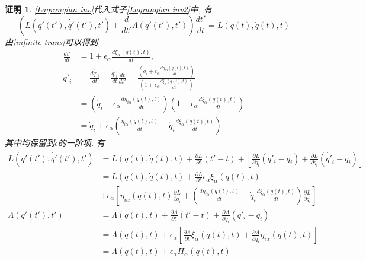 \documentclass[a4paper,11pt]{article}
\theoremstyle{mystyle}
\newtheorem{Proof}{\hspace{2em}证明}[section]
\begin{document}
\begin{Proof}
  \eqref{Lagrangian inv}代入式子\eqref{Lagrangian inv2}中, 有
  \begin{equation}\label{coninv Lagrangian}
      \left(L(q'(t'),\dot{q'}(t'),t')+\frac{d}{dt'}\Lambda(q'(t'),t')\right)\frac{dt'}{dt}=L(q(t),\dot{q}(t),t)
  \end{equation}
  由\eqref{infinite trans}可以得到
  \begin{equation*}
    \begin{split}
       \frac{dt'}{dt}&=1+\epsilon_\alpha\frac{d\xi_\alpha(q(t),t)}{dt},\\
        \dot{q'}_i&=\frac{d\dot{q'}_i}{dt}=\frac{\dot{q'}_i}{dt}\frac{dt}{dt'}=\frac{\left(\dot{q}_i+\epsilon_\alpha\frac{d\eta_{i\alpha}(q(t),t)}{dt}\right)}{\left(1+\epsilon_\alpha\frac{d\xi_{\alpha}(q(t),t)}{dt}\right)}\\
         &=\left(\dot{q}_i+\epsilon_\alpha\frac{d\eta_{i\alpha}(q(t),t)}{dt}\right)\left(1-\epsilon_\alpha\frac{d\xi_{\alpha}(q(t),t)}{dt}\right)\\
         &=\dot{q}_i+\epsilon_\alpha\left(\frac{\eta_{i\alpha}(q(t),t)}{dt}-\dot{q}_i\frac{d\xi_{\alpha}(q(t),t)}{dt}\right)
    \end{split}
  \end{equation*}
  其中均保留到$\epsilon$的一阶项. 有
  \begin{equation*}
    \begin{split}
       L(q'(t'),\dot{q'}(t'),t')&=L(q(t),\dot{q}(t),t)+\frac{\partial L}{\partial t}(t'-t)+\left[\frac{\partial{L}}{\partial{\dot{q}_i}}(q'_i-q_i)+\frac{\partial L}{\partial{\dot{q}_i}}(\dot{q'}_i-\dot{q}_i)\right]\\
         & =L(q(t),\dot{q}(t),t)+\frac{\partial L}{\partial t}\epsilon_\alpha\xi_\alpha(q(t),t)\\
         & +\epsilon_\alpha\left[\eta_{i\alpha}(q(t),t)\frac{\partial L}{\partial {q_i}}+\left(\frac{d\eta_{i\alpha}(q(t),t)}{dt}-\dot{q}_i\frac{d\xi_\alpha(q(t),t)}{dt}\right)\frac{\partial L}{\partial \dot{q}_i}\right]\\
         \Lambda(q'(t'),t')&=\Lambda(q(t),t)+\frac{\partial \Lambda}{\partial t}(t'-t)+\frac{\partial \Lambda}{\partial{q_i}}(q'_i-q_i)\\
         &=\Lambda(q(t),t)+\epsilon_\alpha\left[\frac{\partial \Lambda}{\partial t}\xi_\alpha(q(t),t)+\frac{\partial \Lambda}{\partial q_i}\eta_{i\alpha}(q(t),t)\right]\\
         &=\Lambda(q(t),t)+\epsilon_\alpha\Pi_\alpha(q(t),t)
    \end{split}

\end{equation*}
\end{Proof}
\end{document}
